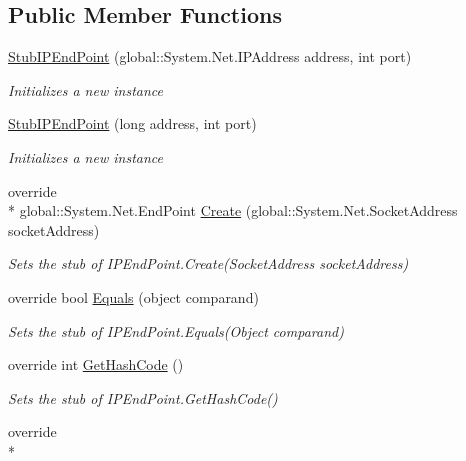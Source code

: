 \subsection*{Public Member Functions}
\begin{DoxyCompactItemize}
\item 
\hyperlink{class_system_1_1_net_1_1_fakes_1_1_stub_i_p_end_point_ad9d3432761a6b077ef08d779fbb06e51}{Stub\-I\-P\-End\-Point} (global\-::\-System.\-Net.\-I\-P\-Address address, int port)
\begin{DoxyCompactList}\small\item\em Initializes a new instance\end{DoxyCompactList}\item 
\hyperlink{class_system_1_1_net_1_1_fakes_1_1_stub_i_p_end_point_aee872867d689ef2dd524bf46e59c2724}{Stub\-I\-P\-End\-Point} (long address, int port)
\begin{DoxyCompactList}\small\item\em Initializes a new instance\end{DoxyCompactList}\item 
override \\*
global\-::\-System.\-Net.\-End\-Point \hyperlink{class_system_1_1_net_1_1_fakes_1_1_stub_i_p_end_point_abdf68176b73bf0a5be139ed931289d68}{Create} (global\-::\-System.\-Net.\-Socket\-Address socket\-Address)
\begin{DoxyCompactList}\small\item\em Sets the stub of I\-P\-End\-Point.\-Create(\-Socket\-Address socket\-Address)\end{DoxyCompactList}\item 
override bool \hyperlink{class_system_1_1_net_1_1_fakes_1_1_stub_i_p_end_point_a79eab16114ad1b50dca348607ed6b103}{Equals} (object comparand)
\begin{DoxyCompactList}\small\item\em Sets the stub of I\-P\-End\-Point.\-Equals(\-Object comparand)\end{DoxyCompactList}\item 
override int \hyperlink{class_system_1_1_net_1_1_fakes_1_1_stub_i_p_end_point_a1ad94fba9feee12e0a8524aed58e3bb9}{Get\-Hash\-Code} ()
\begin{DoxyCompactList}\small\item\em Sets the stub of I\-P\-End\-Point.\-Get\-Hash\-Code()\end{DoxyCompactList}\item 
override \\*

\end{DoxyCompactItemize}
